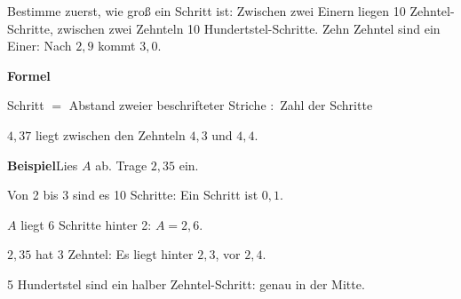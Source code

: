 \documentclass[11pt]{article}
\makeatletter
\newlength{\kr}
\newcommand{\karomerk}[2]{\protected@write\@auxout{}{\string\karoseite{#1}{#2}{\thepage}}}
\newcommand{\karoseite}[3]{\expandafter\xdef\csname karo@#1@#2\endcsname{#3}}
\makeatother
\begin{document}
\ifdim\kr>12mm\karomerk{k}{A}\noindent{\scriptsize\color{mbgrau}Platz zum Rechnen}\par\nointerlineskip\vspace{1mm}\noindent
\begin{tikzpicture}\clip (0,0) rectangle ({\linewidth-0.5mm},\kr);\draw[black!16,line width=0.3pt,step=5mm] (0,0) grid (\linewidth,\kr);\end{tikzpicture}\fi\par
\clearpage\label{s:B}\noindent\colorbox{black!12}{}\hspace{3mm}{\Large\bfseries Am Zahlenstrahl: ablesen, eintragen, weiterzählen}\par\smallskip
\noindent Bestimme zuerst, wie groß ein Schritt ist: Zwischen zwei Einern liegen 10 Zehntel-Schritte, zwischen zwei Zehnteln 10 Hundertstel-Schritte. Zehn Zehntel sind ein Einer: Nach $2{,}9$ kommt $3{,}0$.\par\medskip
\noindent\textbf{Formel}\par\nopagebreak\noindent\hspace*{4mm}\begin{minipage}{\dimexpr\linewidth-4mm\relax}Schritt $=$ Abstand zweier beschrifteter Striche $:$ Zahl der Schritte \par\vspace{4pt} $4{,}37$ liegt zwischen den Zehnteln $4{,}3$ und $4{,}4$.\end{minipage}\par\medskip
\noindent\textbf{Beispiel}\quad Lies $A$ ab. Trage $2{,}35$ ein.\par\smallskip
\noindent\begin{minipage}[t]{0.6\linewidth}\vspace{0pt}\par\noindent{}Von 2 bis 3 sind es 10 Schritte: Ein Schritt ist $0{,}1$.\par\smallskip\par\noindent{}$A$ liegt 6 Schritte hinter 2: $A = 2{,}6$.\par\smallskip\par\noindent{}$2{,}35$ hat 3 Zehntel: Es liegt hinter $2{,}3$, vor $2{,}4$.\par\smallskip\par\noindent{}5 Hundertstel sind ein halber Zehntel-Schritt: genau in der Mitte.\par\smallskip\end{minipage}\hfill
\end{document}
